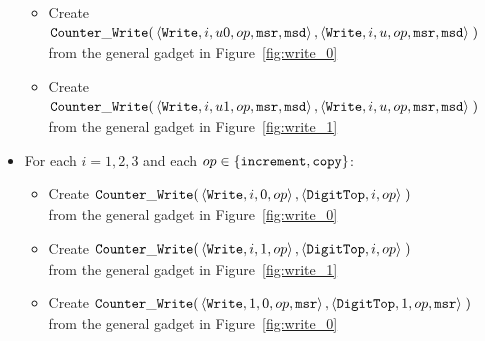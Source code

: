 \begin{itemize}
\begin{itemize}
        \item Create
        $\begin{aligned}[t]
            {\tt Counter\_Write}(& \left\langle {\tt Write}, i, u0, op, {\tt msr}, {\tt msd} \right\rangle,
                       \left\langle {\tt Write}, i, u,  op, {\tt msr}, {\tt msd} \right\rangle \;)
        \end{aligned}$ \\ from the general gadget in Figure~\ref{fig:write_0}

        \item Create
        $\begin{aligned}[t]
            {\tt Counter\_Write}(& \left\langle {\tt Write}, i,  u1, op, {\tt msr}, {\tt msd}\right\rangle,
                       \left\langle {\tt Write}, i,  u,  op, {\tt msr}, {\tt msd}\right\rangle \;)
        \end{aligned}$ \\ from the general gadget in Figure~\ref{fig:write_1}
        \end{itemize}

    \item For each $i = 1,2,3$ and each $op \in \{{\tt increment}, {\tt copy} \}$:
    \begin{itemize}
        \item Create
        $\begin{aligned}[t]
            {\tt Counter\_Write}(& \left\langle {\tt Write},    i, 0, op \right\rangle,
                       \left\langle {\tt DigitTop}, i,    op \right\rangle \;)
        \end{aligned}$ \\ from the general gadget in Figure~\ref{fig:write_0}

        \item Create
        $\begin{aligned}[t]
            {\tt Counter\_Write}(& \left\langle {\tt Write},    i, 1, op \right\rangle,
                       \left\langle {\tt DigitTop}, i,    op \right\rangle \;)
        \end{aligned}$ \\ from the general gadget in Figure~\ref{fig:write_1}

        \item Create
        $\begin{aligned}[t]
            {\tt Counter\_Write}(& \left\langle {\tt Write},    1, 0, op, {\tt msr} \right\rangle,
                       \left\langle {\tt DigitTop}, 1,    op, {\tt msr} \right\rangle \;)
        \end{aligned}$ \\ from the general gadget in Figure~\ref{fig:write_0}


\end{itemize}
\end{itemize}

